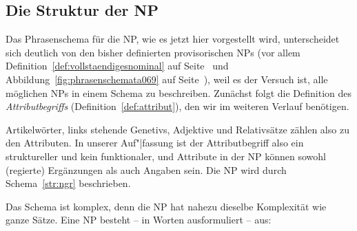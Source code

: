\subsection{Die Struktur der NP}
\label{sec:diestrukturdernp}

Das Phrasenschema für die NP, wie es jetzt hier vorgestellt wird, unterscheidet sich deutlich von den bisher definierten provisorischen NPs (vor allem Definition~\ref{def:vollstaendigesnominal} auf Seite~\pageref{def:vollstaendigesnominal} und Abbildung~\ref{fig:phrasenschemata069} auf Seite~\pageref{fig:phrasenschemata069}), weil es der Versuch ist, alle möglichen NPs in einem Schema zu beschreiben.
Zunächst folgt die Definition des \textit{Attributbegriffs} (Definition~\ref{def:attribut}), den wir im weiteren Verlauf benötigen.


Artikelwörter, links stehende Genetivs, Adjektive und Relativsätze zählen also zu den Attributen.
In unserer Auf"|fassung ist der Attributbegriff also ein struktureller und kein funktionaler, und Attribute in der NP können sowohl (regierte) Ergänzungen als auch Angaben sein.
Die NP wird durch Schema~\ref{str:ngr} beschrieben.


\Stretch[2]


Das Schema ist komplex, denn die NP hat nahezu dieselbe Komplexität wie ganze Sätze.
Eine NP besteht -- in Worten ausformuliert -- aus:


\Stretch[0.5]

